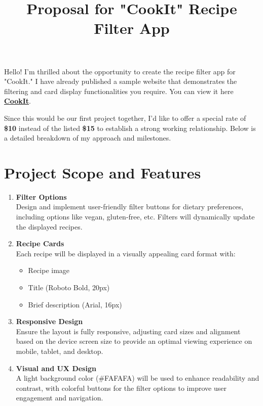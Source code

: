 \documentclass{article}
\title{\textbf{Proposal for "CookIt" Recipe Filter App}}
\author{}
\date{}
\begin{document}
\maketitle

\noindent
Hello! I’m thrilled about the opportunity to create the recipe filter app for "CookIt." I have already published a sample website that demonstrates the filtering and card display functionalities you require. You can view it here   {\Large \textbf{\href{https://mohammedel-sayedahmed.github.io/CookIt/}{CookIt}}}.

Since this would be our first project together, I’d like to offer a special rate of \textbf{\$10} instead of the listed \textbf{\$15} to establish a strong working relationship. Below is a detailed breakdown of my approach and milestones.

\section*{Project Scope and Features}

\begin{enumerate}[label=\arabic*.]
    \item \textbf{Filter Options} \\
    Design and implement user-friendly filter buttons for dietary preferences, including options like vegan, gluten-free, etc. Filters will dynamically update the displayed recipes.
    
    \item \textbf{Recipe Cards} \\
    Each recipe will be displayed in a visually appealing card format with:
    \begin{itemize}
        \item Recipe image
        \item Title (Roboto Bold, 20px)
        \item Brief description (Arial, 16px)
    \end{itemize}
    
    \item \textbf{Responsive Design} \\ 
    Ensure the layout is fully responsive, adjusting card sizes and alignment based on the device screen size to provide an optimal viewing experience on mobile, tablet, and desktop.
    
    \item \textbf{Visual and UX Design} \\ 
    A light background color (\#FAFAFA) will be used to enhance readability and contrast, with colorful buttons for the filter options to improve user engagement and navigation.
\end{enumerate}
\end{document}
